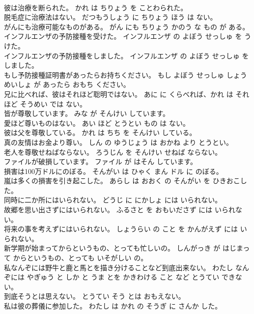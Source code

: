 \documentclass[8pt]{extreport}
\begin{document}
\begin{CJK}{UTF8}{min}
\\	彼は治療を断られた。	かれ は ちりょう を ことわられた。	
\\	脱毛症に治療法はない。	だつもうしょう に ちりょう ほう は ない。	
\\	がんにも治療可能なものがある。	がん にも ちりょう かのう な もの が ある。	
\\	インフルエンザの予防接種を受けた。	インフルエンザ の よぼう せっしゅ を うけた。	
\\	インフルエンザの予防接種をしました。	インフルエンザ の よぼう せっしゅ を しました。	
\\	もし予防接種証明書があったらお持ちください。	もし よぼう せっしゅ しょうめいしょ が あったら おもち ください。	
\\	兄に比べれば、彼はそれほど聡明ではない。	あに に くらべれば、かれ は それほど そうめい では ない。	
\\	皆が尊敬しています。	みな が そんけい しています。	
\\	愛ほど尊いものはない。	あい ほど とうとい もの は ない。	
\\	彼は父を尊敬している。	かれ は ちち を そんけい している。	
\\	真の友情はお金より尊い。	しん の ゆうじょう は おかね より とうとい。	
\\	老人を尊敬せねばならない。	ろうじん を そんけい せねば ならない。	
\\	ファイルが破損しています。	ファイル が はそん しています。	
\\	損害は100万ドルにのぼる。	そんがい は ひゃく まん ドル に のぼる。	
\\	嵐は多くの損害を引き起こした。	あらし は おおく の そんがい を ひきおこした。	
\\	同時に二か所にはいられない。	どうじ に にかしょ には いられない。	
\\	故郷を思い出さずにはいられない。	ふるさと を おもいださず には いられない。	
\\	将来の事を考えずにはいられない。	しょうらい の こと を かんがえず には いられない。	
\\	新学期が始まってからというもの、とっても忙しいの。	しんがっき が はじまって からというもの、とっても いそがしい の。	
\\	私なんぞには野牛と鹿と馬とを描き分けることなど到底出来ない。	わたし なんぞには やぎゅう と しか と うま とを かきわける こと など とうてい できない。	
\\	到底そうとは思えない。	とうてい そう とは おもえない。	
\\	私は彼の葬儀に参加した。	わたし は かれ の そうぎ に さんか した。	

\end{CJK}
\end{document}
